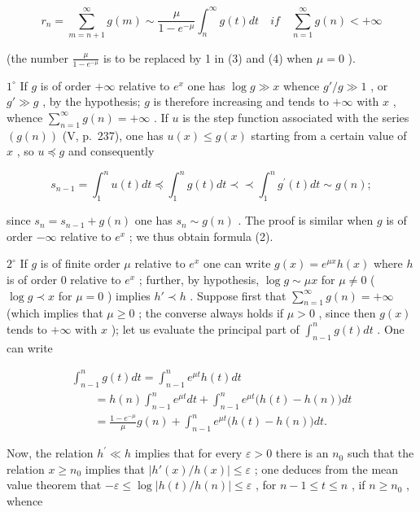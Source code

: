 \[
r _ {n} = \sum_ {m = n + 1} ^ {\infty} g (m) \sim \frac {\mu}{1 - e ^ {- \mu}} \int_ {n} ^ {\infty} g (t) d t \quad i f \quad \sum_ {n = 1} ^ {\infty} g (n) <   + \infty\tag{4}
\]

(the number \(\frac{\mu}{1 - e^{-\mu}}\) is to be replaced by 1 in (3) and (4) when \(\mu = 0\) ).

\(1^{\circ}\) If \(g\) is of order \(+\infty\) relative to \(e^{x}\) one has \(\log g \gg x\) whence \(g' / g \gg 1\) , or \(g' \gg g\) , by the hypothesis; \(g\) is therefore increasing and tends to \(+\infty\) with \(x\) , whence \(\sum_{n=1}^{\infty} g(n) = +\infty\) . If \(u\) is the step function associated with the series \((g(n))\) (V, p.~237), one has \(u(x) \leqslant g(x)\) starting from a certain value of \(x\) , so \(u \preccurlyeq g\) and consequently

\[
s _ {n - 1} = \int_ {1} ^ {n} u (t) d t \preccurlyeq \int_ {1} ^ {n} g (t) d t \prec \prec \int_ {1} ^ {n} g ^ {\prime} (t) d t \sim g (n);
\]

since \(s_n = s_{n-1} + g(n)\) one has \(s_n \sim g(n)\) . The proof is similar when \(g\) is of order \(-\infty\) relative to \(e^x\) ; we thus obtain formula (2).

\(2^{\circ}\) If \(g\) is of finite order \(\mu\) relative to \(e^{x}\) one can write \(g(x) = e^{\mu x}h(x)\) where \(h\) is of order 0 relative to \(e^{x}\) ; further, by hypothesis, \(\log g \sim \mu x\) for \(\mu \neq 0\) ( \(\log g \prec x\) for \(\mu = 0\) ) implies \(h' \prec h\) . Suppose first that \(\sum_{n=1}^{\infty} g(n) = +\infty\) (which implies that \(\mu \geqslant 0\) ; the converse always holds if \(\mu > 0\) , since then \(g(x)\) tends to \(+\infty\) with \(x\) ); let us evaluate the principal part of \(\int_{n-1}^{n} g(t) dt\) . One can write

\[
\begin{array}{l} \int_ {n - 1} ^ {n} g (t) d t = \int_ {n - 1} ^ {n} e ^ {\mu t} h (t) d t \\ \qquad = h (n) \int_ {n - 1} ^ {n} e ^ {\mu t} d t + \int_ {n - 1} ^ {n} e ^ {\mu t} \big (h (t) - h (n) \big) d t \\ \qquad = \frac {1 - e ^ {- \mu}}{\mu} g (n) + \int_ {n - 1} ^ {n} e ^ {\mu t} \big (h (t) - h (n) \big) d t. \end{array}
\]

Now, the relation \(h^{\prime} \ll h\) implies that for every \(\varepsilon > 0\) there is an \(n_{0}\) such that the relation \(x \geqslant n_{0}\) implies that \(\left|h'(x)/h(x)\right| \leqslant \varepsilon\) ; one deduces from the mean value theorem that \(-\varepsilon \leqslant \log |h(t)/h(n)| \leqslant \varepsilon\) , for \(n - 1 \leqslant t \leqslant n\) , if \(n \geqslant n_{0}\) , whence

